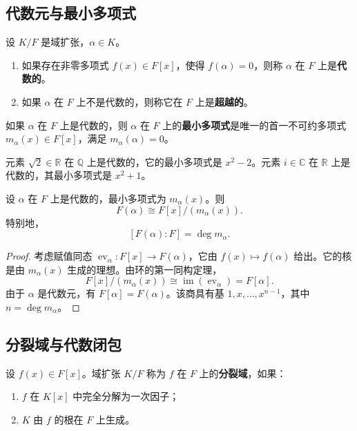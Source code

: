 \subsection{代数元与最小多项式}

\begin{definition}[代数元与超越元]
设 $K/F$ 是域扩张，$\alpha\in K$。
\begin{enumerate}
    \item 如果存在非零多项式 $f(x)\in F[x]$，使得 $f(\alpha)=0$，则称 $\alpha$ 在 $F$ 上是\textbf{代数的}。
    \item 如果 $\alpha$ 在 $F$ 上不是代数的，则称它在 $F$ 上是\textbf{超越的}。
\end{enumerate}
\end{definition}

\begin{definition}[最小多项式]
如果 $\alpha$ 在 $F$ 上是代数的，则 $\alpha$ 在 $F$ 上的\textbf{最小多项式}是唯一的首一不可约多项式 $m_\alpha(x)\in F[x]$，满足 $m_\alpha(\alpha)=0$。
\end{definition}

\begin{example}
元素 $\sqrt{2}\in\mathbb{R}$ 在 $\mathbb{Q}$ 上是代数的，它的最小多项式是 $x^2-2$。元素 $i\in\mathbb{C}$ 在 $\mathbb{R}$ 上是代数的，其最小多项式是 $x^2+1$。
\end{example}

\begin{theorem}[单代数扩张]
设 $\alpha$ 在 $F$ 上是代数的，最小多项式为 $m_\alpha(x)$。则
\[
    F(\alpha)\cong F[x]/(m_\alpha(x)).
\]
特别地，
\[
    [F(\alpha):F]=\deg m_\alpha.
\]
\end{theorem}

\begin{proof}
考虑赋值同态 $\operatorname{ev}_\alpha:F[x]\to F(\alpha)$，它由 $f(x)\mapsto f(\alpha)$ 给出。它的核是由 $m_\alpha(x)$ 生成的理想。由环的第一同构定理，
\[
    F[x]/(m_\alpha(x))\cong \operatorname{im}(\operatorname{ev}_\alpha)=F[\alpha].
\]
由于 $\alpha$ 是代数元，有 $F[\alpha]=F(\alpha)$。该商具有基 $1,x,\dots,x^{n-1}$，其中 $n=\deg m_\alpha$。
\end{proof}

\subsection{分裂域与代数闭包}

\begin{definition}[分裂域]
设 $f(x)\in F[x]$。域扩张 $K/F$ 称为 $f$ 在 $F$ 上的\textbf{分裂域}，如果：
\begin{enumerate}
    \item $f$ 在 $K[x]$ 中完全分解为一次因子；
    \item $K$ 由 $f$ 的根在 $F$ 上生成。
\end{enumerate}
\end{definition}

